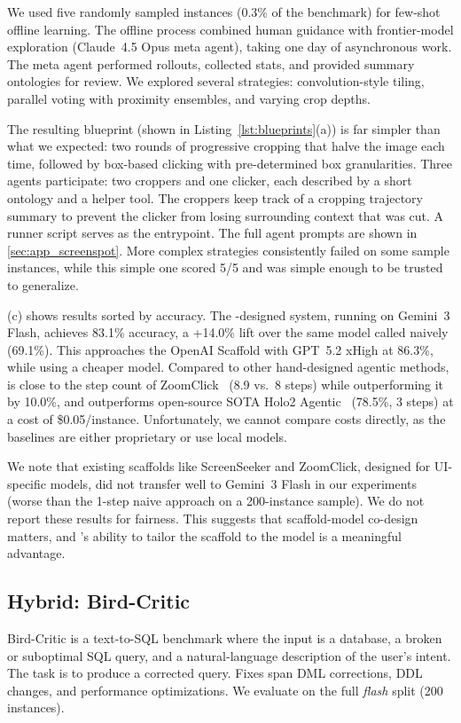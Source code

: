We used five randomly sampled instances (0.3\% of the benchmark) for few-shot offline learning. The offline process combined human guidance with frontier-model exploration (Claude~4.5 Opus meta agent), taking one day of asynchronous work. The meta agent performed rollouts, collected stats, and provided summary ontologies for review. We explored several strategies: convolution-style tiling, parallel voting with proximity ensembles, and varying crop depths.

The resulting blueprint (shown in Listing~\ref{lst:blueprints}(a)) is far simpler than what we expected: two rounds of progressive cropping that halve the image each time, followed by box-based clicking with pre-determined box granularities. Three agents participate: two croppers and one clicker, each described by a short ontology and a helper tool. The croppers keep track of a cropping trajectory summary to prevent the clicker from losing surrounding context that was cut. A runner script serves as the entrypoint. The full agent prompts are shown in \cref{sec:app_screenspot}. More complex strategies consistently failed on some sample instances, while this simple one scored 5/5 and was simple enough to be trusted to generalize.

(c) shows results sorted by accuracy. The \sysname-designed system, running on Gemini~3 Flash, achieves 83.1\% accuracy, a +14.0\% lift over the same model called naively (69.1\%). This approaches the OpenAI Scaffold with GPT~5.2 xHigh at 86.3\%, while using a cheaper model. Compared to other hand-designed agentic methods, \sysname is close to the step count of ZoomClick~\cite{zoomclick2025} (8.9 vs.\ 8 steps) while outperforming it by 10.0\%, and outperforms open-source SOTA Holo2 Agentic~\cite{holo2_2025} (78.5\%, 3 steps) at a cost of \$0.05/instance. Unfortunately, we cannot compare costs directly, as the baselines are either proprietary or use local models.

We note that existing scaffolds like ScreenSeeker and ZoomClick, designed for UI-specific models, did not transfer well to Gemini~3 Flash in our experiments (worse than the 1-step naive approach on a 200-instance sample). We do not report these results for fairness. This suggests that scaffold-model co-design matters, and \sysname's ability to tailor the scaffold to the model is a meaningful advantage.

\subsection{Hybrid: Bird-Critic}
\label{sec:eval_hybrid}
Bird-Critic is a text-to-SQL benchmark where the input is a database, a broken or suboptimal SQL query, and a natural-language description of the user's intent. The task is to produce a corrected query. Fixes span DML corrections, DDL changes, and performance optimizations. We evaluate on the full \textit{flash} split (200 instances).

